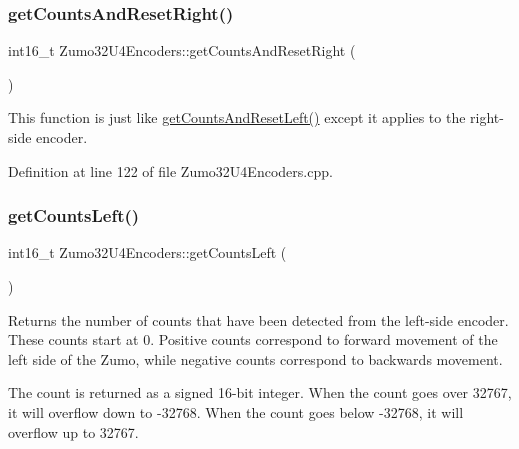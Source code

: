 \mbox{\label{class_zumo32_u4_encoders_a613358c24dbc997cb9fee36d66bbf2ba}} 
\subsubsection{\texorpdfstring{get\+Counts\+And\+Reset\+Right()}{getCountsAndResetRight()}}
{\footnotesize\ttfamily int16\+\_\+t Zumo32\+U4\+Encoders\+::get\+Counts\+And\+Reset\+Right (\begin{DoxyParamCaption}{ }\end{DoxyParamCaption})\hspace{0.3cm}{\ttfamily [static]}}

This function is just like \hyperlink{class_zumo32_u4_encoders_a9b212103e652d1edb9d622381c303497}{get\+Counts\+And\+Reset\+Left()} except it applies to the right-\/side encoder. 

Definition at line 122 of file Zumo32\+U4\+Encoders.\+cpp.

\mbox{\label{class_zumo32_u4_encoders_a142d33610a12b209e257c1635b2daae6}} 
\subsubsection{\texorpdfstring{get\+Counts\+Left()}{getCountsLeft()}}
{\footnotesize\ttfamily int16\+\_\+t Zumo32\+U4\+Encoders\+::get\+Counts\+Left (\begin{DoxyParamCaption}{ }\end{DoxyParamCaption})\hspace{0.3cm}{\ttfamily [static]}}

Returns the number of counts that have been detected from the left-\/side encoder. These counts start at 0. Positive counts correspond to forward movement of the left side of the Zumo, while negative counts correspond to backwards movement.

The count is returned as a signed 16-\/bit integer. When the count goes over 32767, it will overflow down to -\/32768. When the count goes below -\/32768, it will overflow up to 32767. 

